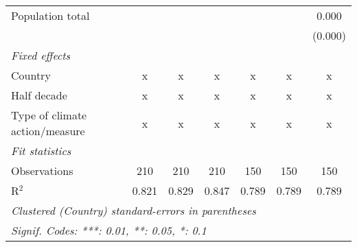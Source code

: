 \begin{tabular}{lcccccc}
   Population total                                                        &         &               &                &                &                & 0.000\\   
                                                                           &         &               &                &                &                & (0.000)\\   
   \emph{Fixed effects}\\
   Country                                                                 & x       & x             & x              & x              & x              & x\\  
   Half decade                                                             & x       & x             & x              & x              & x              & x\\  
   Type of climate action/measure                                          & x       & x             & x              & x              & x              & x\\  
   \midrule \emph{Fit statistics}\\
   Observations                                                            & 210     & 210           & 210            & 150            & 150            & 150\\  
   R$^2$                                                                   & 0.821   & 0.829         & 0.847          & 0.789          & 0.789          & 0.789\\  
   \midrule
   \multicolumn{7}{l}{\emph{Clustered (Country) standard-errors in parentheses}}\\
   \multicolumn{7}{l}{\emph{Signif. Codes: ***: 0.01, **: 0.05, *: 0.1}}\\
\end{tabular}
\par\endgroup


